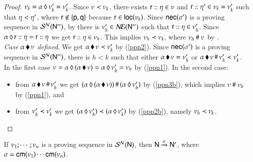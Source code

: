 \begin{proof}
$\nu_k={\alpha}\,\lozenge\,{\nu_k'}=\nu_k'$.  Since
$\nu\prec \nu_k$, there exists
${\sf r}:: \eta\in \nu$ and ${\sf r}:: \eta'\in
\nu_k=\nu_k'$ such that $\eta<\eta'$,
where ${\sf r} \notin \{{\sf p},{\sf q}\}$
because ${\sf r} \in {\sf loc}(\nu_k)$. 
 Since
${\sf nec}(\sigma')$ is a proving sequence in  
$\mathcal{S}^{\mathcal{N}}({\sf N}'')$,  by
 there is $\nu_h'  \in \mathcal{N\!E}({\sf N}'')$ such that ${\sf r}:: \eta\in
\nu_h'$.  Since ${\alpha}\,\lozenge\,{{\sf r}:: \eta}={\sf r}:: \eta$ we
get ${\sf r}:: \eta\in \nu_h$. This implies
$\nu_h\prec\nu_k$,  where $\nu_h~\#~\nu$  by
. 
\\
{\em Case ${\alpha}\,\blacklozenge\,{\nu}$ defined}. We get
${\alpha}\,\blacklozenge\,{\nu}\prec{\nu'_k}$ by
(\ref{ppn2}).  Since ${\sf nec}(\sigma')$ is a
proving sequence in $\mathcal{S}^{\mathcal{N}}({\sf N}'')$, there is $h<k$ such that either
${\alpha}\,\blacklozenge\,{\nu}=\nu_h'$ or
${\alpha}\,\blacklozenge\,{\nu}\,\#\,\nu_h'\prec\nu_k'$.  In the first case
$\nu={\alpha}\,\lozenge\,{({\alpha}\,\blacklozenge\,{\nu})}={\alpha}\,\lozenge\,{\nu_h'}=\nu_h$
by (\ref{ppn1}).  %
In the second case: \begin{itemize}\item from
  ${\alpha}\,\blacklozenge\,{\nu}\,\#\,\nu_h'$ we get
  $({\alpha}\,\lozenge\,{({\alpha}\,\blacklozenge\,{\nu})})\,\#\,({\alpha}\,\lozenge\,{\nu_h'})$
  by
  (\ref{ppn3b}),
  which implies $\nu~\#~\nu_h$ by
  (\ref{ppn1}), and
\item from $\nu_h'\prec\nu_k'$ we get
  $({\alpha}\,\lozenge\,{\nu_h'})\prec({\alpha}\,\lozenge\,{\nu_k'})$ by
  (\ref{ppn2b}),  namely 
  $\nu_h\prec\nu_k$. \qedhere
\end{itemize}
\end{proof}



\begin{theorem}
If  
$\nu_1;\cdots;\nu_n$ is a proving sequence in $\mathcal{S}^{\mathcal{N}}({\sf N})$, 
then ${\sf N}\xrightarrow{\sigma}{\sf N}'$, where $\sigma={\sf cm}(\nu_1)\cdots{\sf cm}(\nu_n)$.
\end{theorem}


